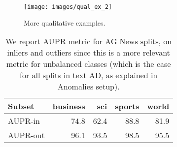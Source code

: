 \documentclass[11pt]{article}
\begin{document}
\begin{figure}[t]
\centering
\texttt{[image: images/qual\_ex\_2]} 
\caption{More qualitative examples.}
\label{fig: qual_ex_2}
\end{figure}


\begin{table}[t]
\centering
\begin{tabular}{l  r r r r}
\toprule
\multicolumn{1}{p{1cm}}{Subset} & business & sci & sports & world\\
\midrule
AUPR-in  & 74.8 & 62.4 & 88.8 & 81.9 \\
AUPR-out & 96.1 & 93.5 & 98.5 & 95.5 \\

\bottomrule
\end{tabular}
\caption{We report AUPR metric for AG News splits, on inliers and outliers since this is a more relevant metric for unbalanced classes (which is the case for all splits in text AD, as explained in Anomalies setup).}
\label{tab:prauc_experiments}
\end{table}
\end{document}
